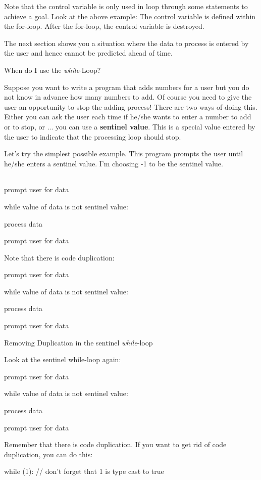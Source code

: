 \documentclass[
]{article}
\begin{document}
Note that the control variable is only used in loop through some
statements to achieve a goal. Look at the above example: The control
variable is defined within the for-loop. After the for-loop, the control
variable is destroyed.

The next section shows you a situation where the data to process is
entered by the user and hence cannot be predicted ahead of time.

When do I use the \emph{while}-Loop?

Suppose you want to write a program that adds numbers for a user but you
do not know in advance how many numbers to add. Of course you need to
give the user an opportunity to stop the adding process! There are two
ways of doing this. Either you can ask the user each time if he/she
wants to enter a number to add or to stop, or ... you can use a
\textbf{sentinel value}. This is a special value entered by the user to
indicate that the processing loop should stop.

Let's try the simplest possible example. This program prompts the user
until he/she enters a sentinel value. I'm choosing -1 to be the sentinel
value.

\begin{longtable}[]{@{}@{}}
\toprule
\endhead
\bottomrule
\end{longtable}

prompt user for data

while value of data is not sentinel value:

process data

prompt user for data

Note that there is code duplication:

prompt user for data

while value of data is not sentinel value:

process data

prompt user for data

Removing Duplication in the sentinel \emph{while}-loop

Look at the sentinel while-loop again:

prompt user for data

while value of data is not sentinel value:

process data

prompt user for data

Remember that there is code duplication. If you want to get rid of code
duplication, you can do this:

while (1): // don't forget that 1 is type cast to true
\end{document}
